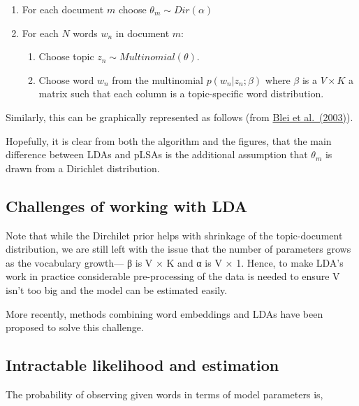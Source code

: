 \documentclass[
]{book}
\begin{document}
\begin{enumerate}
\def\labelenumi{\arabic{enumi}.}
\item
  For each document \(m\) choose \(\theta_m \sim Dir(\alpha)\)
\item
  For each \(N\) words \(w_n\) in document \(m\):

  \begin{enumerate}
  \def\labelenumii{\arabic{enumii}.}
  \item
    Choose topic \(z_{n} \sim Multinomial(\theta)\).
  \item
    Choose word \(w_n\) from the multinomial \(p(w_n|z_n;\beta)\) where \(\beta\) is a \(V\times K\) a matrix such that each column is a topic-specific word distribution.
  \end{enumerate}
\end{enumerate}

Similarly, this can be graphically represented as follows (from \href{https://www.jmlr.org/papers/volume3/blei03a/blei03a.pdf}{Blei et al.~(2003)}).

Hopefully, it is clear from both the algorithm and the figures, that the main difference between LDAs and pLSAs is the additional assumption that \(\theta_m\) is drawn from a Dirichlet distribution.

\hypertarget{challenges-of-working-with-lda}{%
\subsection{Challenges of working with LDA}\label{challenges-of-working-with-lda}}

Note that while the Dirchilet prior helps with shrinkage of the topic-document distribution, we are still left with the issue that the number of parameters grows as the vocabulary growth--- β is V × K and α is V × 1. Hence, to make LDA's work in practice considerable pre-processing of the data is needed to ensure V isn't too big and the model can be estimated easily.

More recently, methods combining word embeddings and LDAs have been proposed to solve this challenge.

\hypertarget{intractable-likelihood-and-estimation}{%
\subsection{Intractable likelihood and estimation}\label{intractable-likelihood-and-estimation}}

The probability of observing given words in terms of model parameters is,
\end{document}
